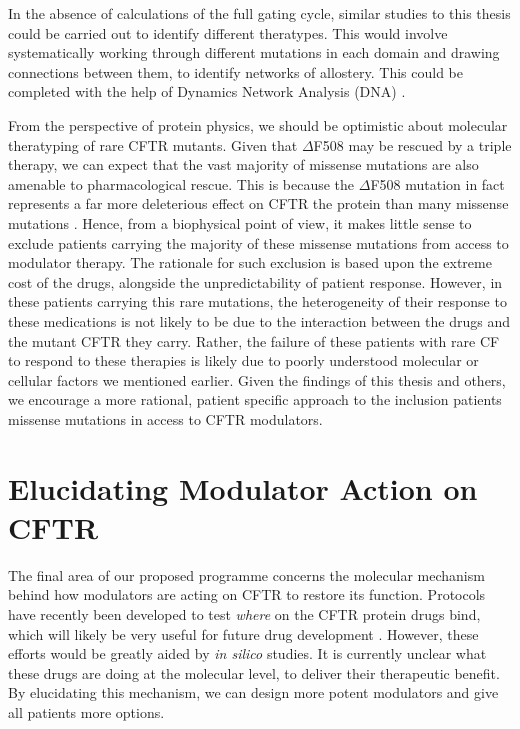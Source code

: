 In the absence of calculations of the full gating cycle, similar studies to this thesis could be carried out to identify different theratypes. This would involve systematically working through different mutations in each domain and drawing connections between them, to identify networks of allostery. This could be completed with the help of Dynamics Network Analysis (DNA) \cite{melo2020}. 

From the perspective of protein physics, we should be optimistic about molecular theratyping of rare CFTR mutants. Given that $\Delta$F508 may be rescued by a triple therapy, we can expect that the vast majority of missense mutations are also amenable to pharmacological rescue. This is because the $\Delta$F508 mutation in fact represents a far more deleterious effect on CFTR the protein than many missense mutations \cite{bahia2021}. Hence, from a biophysical point of view, it makes little sense to exclude patients carrying the majority of these missense mutations from access to modulator therapy. The rationale for such exclusion is based upon the extreme cost of the drugs, alongside the unpredictability of patient response. However, in these patients carrying this rare mutations, the heterogeneity of their response to these medications is not likely to be due to the interaction between the drugs and the mutant CFTR they carry. Rather, the failure of these patients with rare CF to respond to these therapies is likely due to poorly understood molecular or cellular factors we mentioned earlier. Given the findings of this thesis and others, we encourage a more rational, patient specific approach to the inclusion patients missense mutations in access to CFTR modulators. 


\section{Elucidating Modulator Action on CFTR}

The final area of our proposed programme concerns the molecular mechanism behind how modulators are acting on CFTR to restore its function. Protocols have recently been developed to test \textit{where} on the CFTR protein drugs bind, which will likely be very useful for future drug development \cite{laselva2022}. However, these efforts would be greatly aided by \textit{in silico} studies. It is currently unclear what these drugs are doing at the molecular level, to deliver their therapeutic benefit. By elucidating this mechanism, we can design more potent modulators and give all patients more options. 

